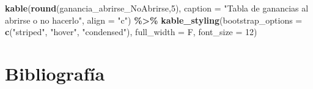 \documentclass[12pt,a4paper,]{book}
\def\ifdoblecara{} %
\def\ifcitapandoc{} %
\let\ifcitapandoc\undefined %
\newenvironment{Shaded}{\begin{snugshade}}{\end{snugshade}}
\newcommand{\AttributeTok}[1]{\textcolor[rgb]{0.13,0.29,0.53}{#1}}
\newcommand{\DecValTok}[1]{\textcolor[rgb]{0.00,0.00,0.81}{#1}}
\newcommand{\FunctionTok}[1]{\textcolor[rgb]{0.13,0.29,0.53}{\textbf{#1}}}
\newcommand{\NormalTok}[1]{#1}
\newcommand{\SpecialCharTok}[1]{\textcolor[rgb]{0.81,0.36,0.00}{\textbf{#1}}}
\newcommand{\StringTok}[1]{\textcolor[rgb]{0.31,0.60,0.02}{#1}}
\numberwithin{dummy}{section}
\theoremstyle{ocrenumbox}
\theoremstyle{blacknumex}
\theoremstyle{blacknumbox}
\theoremstyle{ocrenum}
\theoremstyle{ocrenum}
\begin{document}
\begin{Shaded}
\begin{Highlighting}[]
\FunctionTok{kable}\NormalTok{(}\FunctionTok{round}\NormalTok{(ganancia\_abrirse\_NoAbrirse,}\DecValTok{5}\NormalTok{), }
      \AttributeTok{caption =} \StringTok{"Tabla de ganancias al abrirse o no hacerlo"}\NormalTok{,}
      \AttributeTok{align =} \StringTok{"c"}\NormalTok{) }\SpecialCharTok{\%\textgreater{}\%}
\FunctionTok{kable\_styling}\NormalTok{(}\AttributeTok{bootstrap\_options =} \FunctionTok{c}\NormalTok{(}\StringTok{"striped"}\NormalTok{, }\StringTok{"hover"}\NormalTok{, }\StringTok{"condensed"}\NormalTok{),}
              \AttributeTok{full\_width =}\NormalTok{ F, }\AttributeTok{font\_size =} \DecValTok{12}\NormalTok{)}
\end{Highlighting}
\end{Shaded}

\FloatBarrier
\cleardoublepage

\ifdefined\ifdoblecara
  \fancyhead[LE,RO]{}
  \fancyfoot[LO,RE]{}
\else
  \fancyhead[RO]{}
  \fancyfoot[LO]{}
\fi

\ifdefined\ifcitapandoc

\hypertarget{bibliografuxeda}{%
\chapter*{Bibliografía}\label{bibliografuxeda}}

\else

\nocite{Libro1,Libro2,Libro3,Libro4,Libro5,Libro6,Libro7,Libro8,Libro9,Libro10,Libro11,Libro12,Libro13,Libro14,Libro15,Libro16,Libro17,Libro18,Libro19,Libro20,R-knitr,R-KableExtra,Tidyverse,R-tidyverse}

\fi




%
\end{document}
